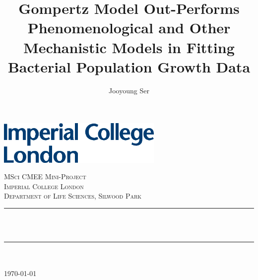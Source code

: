 \documentclass[11pt]{article}
\begin{document}
\begin{titlepage}
\title{Gompertz Model Out-Performs Phenomenological and Other Mechanistic Models in Fitting Bacterial Population Growth Data}
\author{Jooyoung Ser}
\newcommand{\HRule}{\rule{\linewidth}{0.5mm}} %


\includegraphics[width=8cm]{images/logo.eps}\\[1cm] 
 

\center %


\textsc{\LARGE MSci CMEE Mini-Project}\\[1.5cm] %
\textsc{\Large Imperial College London}\\[0.5cm] %
\textsc{\large Department of Life Sciences, Silwood Park}\\[0.5cm] %

\makeatletter
\HRule \\[0.6cm]
{ \huge \bfseries \@title}\\[0.6cm] %
\HRule \\[1.5cm]
 
\Large\@author\\[3cm] %


{\large \today}\\[2cm] %

\vfill %

\end{titlepage}
\end{document}
